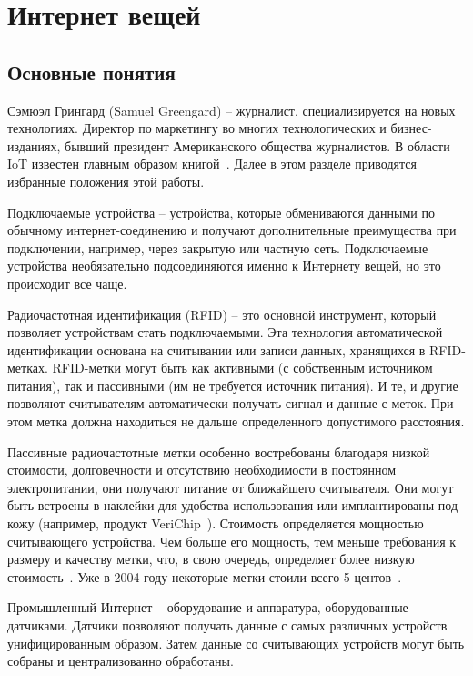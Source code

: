 \section{Интернет вещей} \label{ch1:sec2}

\subsection{Основные понятия} %

Сэмюэл Грингард (Samuel Greengard) – журналист, специализируется на новых технологиях.  Директор по маркетингу во многих технологических и бизнес-изданиях, бывший президент Американского общества журналистов. В области IoT известен главным образом книгой~\cite{src19}. Далее в этом разделе приводятся избранные положения этой работы.

Подключаемые устройства – устройства, которые обмениваются данными по обычному интернет-соединению и получают дополнительные преимущества при подключении, например, через закрытую или частную сеть. Подключаемые устройства необязательно подсоединяются именно к Интернету вещей, но это происходит все чаще.

Радиочастотная идентификация (RFID) – это основной инструмент, который позволяет устройствам стать подключаемыми. Эта технология автоматической идентификации основана на считывании или записи данных, хранящихся в RFID-метках. RFID-метки могут быть как активными (с собственным источником питания), так и пассивными (им не требуется источник питания). И те, и другие позволяют считывателям автоматически получать сигнал и данные с меток. При этом метка должна находиться не дальше определенного допустимого расстояния.

Пассивные радиочастотные метки особенно востребованы благодаря низкой стоимости, долговечности и отсутствию необходимости в постоянном электропитании, они получают питание от ближайшего считывателя. Они могут быть встроены в наклейки для удобства использования или имплантированы под кожу (например, продукт VeriChip~\cite{src16}). Стоимость определяется мощностью считывающего устройства. Чем больше его мощность, тем меньше требования к размеру и качеству метки, что, в свою очередь, определяет более низкую стоимость~\cite{src17}. Уже в 2004 году некоторые метки стоили всего 5 центов~\cite{src18}.

Промышленный Интернет – оборудование и аппаратура, оборудованные датчиками. Датчики позволяют получать данные с самых различных устройств унифицированным образом. Затем данные со считывающих устройств могут быть собраны и централизованно обработаны. 

